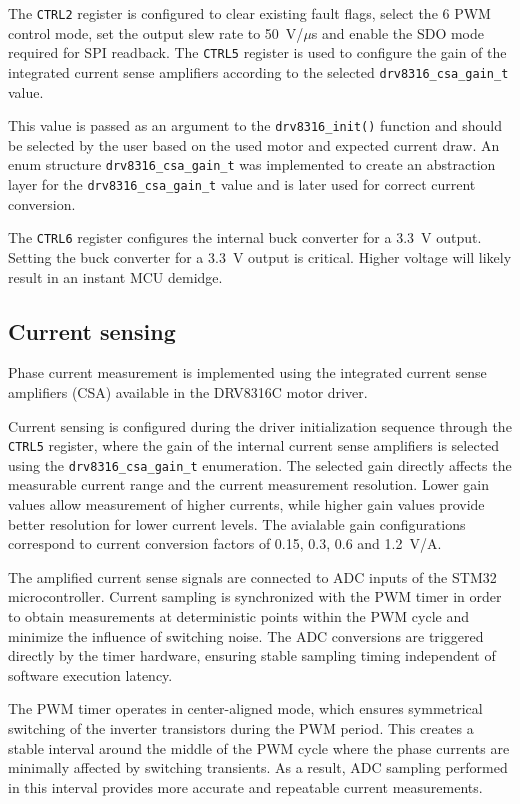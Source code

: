 The \texttt{CTRL2} register is configured to clear existing fault flags, select the 6 PWM control mode, 
set the output slew rate to 50~V/$\mu$s and enable the SDO mode required for SPI readback. 
The \texttt{CTRL5} register is used to configure the gain of the integrated current sense amplifiers according 
to the selected \texttt{drv8316\_csa\_gain\_t} value. \cite{datasheet_DRV8316C}

This value is passed as an argument to the \texttt{drv8316\_init()} function and
should be selected by the user based on the used motor and expected current draw.
An enum structure \texttt{drv8316\_csa\_gain\_t} was implemented to create an abstraction layer for the 
\texttt{drv8316\_csa\_gain\_t} value and is later used for correct current conversion.

The \texttt{CTRL6} register configures the internal buck converter for a 3.3~V output. 
Setting the buck converter for a 3.3~V output is critical. Higher voltage will likely result in an instant MCU demidge.


\subsection{Current sensing}
Phase current measurement is implemented using the integrated current sense amplifiers (CSA) available in the DRV8316C motor driver. 

Current sensing is configured during the driver initialization sequence through the \texttt{CTRL5} register, 
where the gain of the internal current sense amplifiers is selected using the \texttt{drv8316\_csa\_gain\_t} enumeration.
The selected gain directly affects the measurable current range and the current measurement resolution.
Lower gain values allow measurement of higher currents, while higher gain values provide better resolution for lower current levels.
The avialable gain configurations correspond to current conversion factors of 0.15, 0.3, 0.6 and 1.2~V/A.

The amplified current sense signals are connected to ADC inputs of the STM32 microcontroller.
Current sampling is synchronized with the PWM timer in order to obtain measurements 
at deterministic points within the PWM cycle and minimize the influence of switching noise.
The ADC conversions are triggered directly by the timer hardware, ensuring stable sampling timing independent of software execution latency.

The PWM timer operates in center-aligned mode, which ensures symmetrical switching of the inverter transistors during the PWM period.
This creates a stable interval around the middle of the PWM cycle where the phase currents are minimally affected by switching transients.
As a result, ADC sampling performed in this interval provides more accurate and repeatable current measurements.

